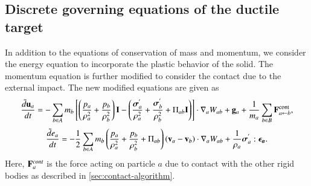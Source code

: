 \subsection{Discrete governing equations of the ductile target}
\label{chap-erosion:sec:discrete-governing-equations}
In addition to the equations of conservation of mass and momentum,
we consider the energy equation to incorporate the plastic behavior of the
solid. The momentum equation is further modified to consider the contact due to
the external impact. The new modified equations are given as
\begin{multline}
\label{eqn:erosion-sph-momentum}
  \frac{\tilde{d}\mathbf{u}_{a}}{dt} = - \sum_{b \in A} m_b \left[
  \left(\frac{p_a}{\rho_a^2} + \frac{p_b}{\rho_b^2}\right) \mathbf{I} -
  \left(\frac{\boldsymbol{\sigma}^{'}_{a}}{\rho_a^2} +
  \frac{\boldsymbol{\sigma}^{'}_{b}}{\rho_b^2} + \Pi_{ab} \mathbf{I} \right) \right]  \cdot \nabla_{a} W_{ab} +
  \mathbf{g}_{a} + \frac{1}{m_a}\sum_{b \in B} \mathbf{F}^{\text{cont}}_{a \leftarrow b},
\end{multline}
\begin{equation}
\label{eqn:erosion-sph-energy}
  \frac{\tilde{d}{e}_{a}}{dt} = - \frac{1}{2} \sum_{b \in A} m_b
  \left(\frac{p_a}{\rho_a^2} + \frac{p_b}{\rho_b^2} + \Pi_{ab} \right)
  \left( \mathbf{v}_a - \mathbf{v}_b \right) \cdot \nabla_{a} W_{ab} +
  \frac{1}{\rho_a} \boldsymbol{\sigma}^{'}_{a} : \boldsymbol{\epsilon_a}.
\end{equation}
Here, $\mathbf{F}^{cont}_{a}$ is the force acting on particle $a$ due to contact
with the other rigid bodies as described in
\cref{sec:contact-algorithm}.

